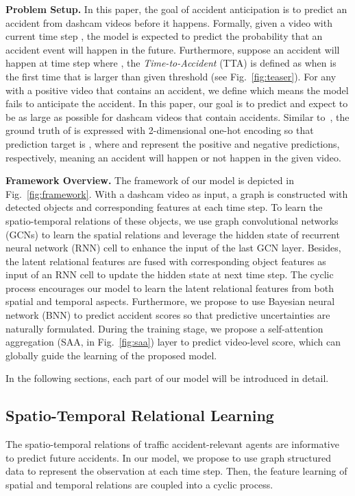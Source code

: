 \documentclass[sigconf]{acmart}
\begin{document}
\textbf{Problem Setup.} In this paper,  the goal of accident anticipation is to predict an accident from dashcam videos before it happens. Formally, given a video with current time step , the model is expected to predict the probability  that an accident event will happen in the future.
Furthermore, suppose an accident will happen at time step  where , the \emph{Time-to-Accident} (TTA) is defined as  when  is the first time that  is larger than given threshold (see Fig.~\ref{fig:teaser}). For any  with a positive video that contains an accident, we define  which means the model fails to anticipate the accident. In this paper, our goal is to predict  and expect  to be as large as possible for dashcam videos that contain accidents. Similar to~\cite{ChanACCV2016}, the ground truth of  is expressed with 2-dimensional one-hot encoding so that prediction target is , where  and  represent the positive and negative predictions, respectively, meaning an accident will happen or not happen in the given video.

\textbf{Framework Overview.} The framework of our model is depicted in Fig.~\ref{fig:framework}. With a dashcam video as input, a graph is constructed with detected objects and corresponding features at each time step. To learn the spatio-temporal relations of these objects, we use graph convolutional networks (GCNs) to learn the spatial relations and leverage the hidden state  of recurrent neural network (RNN) cell to enhance the input of the last GCN layer. Besides, the latent relational features are fused with corresponding object features as input of an RNN cell to update the hidden state at next time step. The cyclic process encourages our model to learn the latent relational features  from both spatial and temporal aspects. Furthermore, we propose to use Bayesian neural network (BNN) to predict accident scores  so that predictive uncertainties are naturally formulated. During the training stage, we propose a self-attention aggregation (SAA, in Fig.~\ref{fig:saa}) layer to predict video-level score, which can globally guide the learning of the proposed model.

In the following sections, each part of our model will be introduced in detail.


\subsection{Spatio-Temporal Relational Learning}

The spatio-temporal relations of traffic accident-relevant agents are informative to predict future accidents. In our model, we propose to use graph structured data to represent the observation at each time step. Then, the feature learning of spatial and temporal relations are coupled into a cyclic process.
\end{document}
